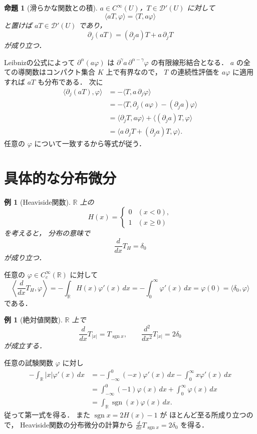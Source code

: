 \documentclass[a5paper,10pt,onecolumn]{jsarticle}
\makeatletter
\theoremstyle{mathnotetheorem}
\newtheorem{proposition}[theorem]{命題}
\newtheorem{example}[theorem]{例}
\renewcommand{\proofname}{証明}
\renewenvironment{proof}[1][\proofname]{%
  \par\pushQED{\qed}\normalfont\topsep4\p@\@plus2\p@\relax
  \trivlist\item[\hskip\labelsep\bfseries #1]\ignorespaces
}{\popQED\endtrivlist\@endpefalse}
\makeatother
\begin{document}
\begin{proposition}[滑らかな関数との積]\label{prop:product}
$a\in C^\infty(U)$，$T\in\mathcal D'(U)$ に対して
\[
 \langle aT,\varphi\rangle=\langle T,a\varphi\rangle
\]
と置けば $aT\in\mathcal D'(U)$ であり，
\[
 \partial_j(aT)=(\partial_ja)T+a\,\partial_jT
\]
が成り立つ．
\end{proposition}
\begin{proof}
Leibnizの公式によって
$\partial^\alpha(a\varphi)$ は
$\partial^\gamma a\,\partial^{\alpha-\gamma}\varphi$
の有限線形結合となる．
$a$ の全ての導関数はコンパクト集合 $K$ 上で有界なので，
$T$ の連続性評価を $a\varphi$ に適用すれば
$aT$ も分布である．
次に
\begin{align*}
 \langle\partial_j(aT),\varphi\rangle
 &=-\langle T,a\,\partial_j\varphi\rangle\\
 &=-\langle T,\partial_j(a\varphi)
                   -(\partial_ja)\varphi\rangle\\
 &=\langle\partial_jT,a\varphi\rangle
   +\langle(\partial_ja)T,\varphi\rangle\\
 &=\langle a\,\partial_jT+(\partial_ja)T,\varphi\rangle.
\end{align*}
任意の $\varphi$ について一致するから等式が従う．
\end{proof}

\section{具体的な分布微分}

\begin{example}[Heaviside関数]
$\mathbb R$ 上の
\[
 H(x)=\begin{cases}0&(x<0),\\1&(x\ge0)\end{cases}
\]
を考えると，
分布の意味で
\[
 \frac{d}{dx}T_H=\delta_0
\]
が成り立つ．
\end{example}
\begin{proof}
任意の $\varphi\in C_c^\infty(\mathbb R)$ に対して
\[
 \left\langle\frac{d}{dx}T_H,\varphi\right\rangle
 =-\int_\mathbb RH(x)\varphi'(x)\,dx
 =-\int_0^\infty\varphi'(x)\,dx
 =\varphi(0)
 =\langle\delta_0,\varphi\rangle
\]
である．
\end{proof}

\begin{example}[絶対値関数]
$\mathbb R$ 上で
\[
 \frac{d}{dx}T_{|x|}=T_{\operatorname{sgn}x},
 \qquad
 \frac{d^2}{dx^2}T_{|x|}=2\delta_0
\]
が成立する．
\end{example}
\begin{proof}
任意の試験関数 $\varphi$ に対し
\begin{align*}
 -\int_\mathbb R|x|\varphi'(x)\,dx
 &=-\int_{-\infty}^0(-x)\varphi'(x)\,dx
   -\int_0^\infty x\varphi'(x)\,dx\\
 &=\int_{-\infty}^0(-1)\varphi(x)\,dx
   +\int_0^\infty\varphi(x)\,dx\\
 &=\int_\mathbb R\operatorname{sgn}(x)\varphi(x)\,dx.
\end{align*}
従って第一式を得る．
また $\operatorname{sgn}x=2H(x)-1$ が
ほとんど至る所成り立つので，
Heaviside関数の分布微分の計算から
$\frac d{dx}T_{\operatorname{sgn}x}=2\delta_0$ を得る．
\end{proof}
\end{document}
